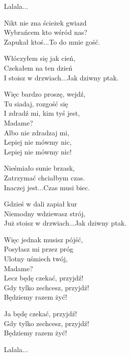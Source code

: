 \begin{textn}
    Lalala...

    Nikt nie zna ścieżek gwiazd\\
    Wybrańcem kto wśród nas?\\
    Zapukał ktoś...To do mnie gość.

    Włóczyłem się jak cień,\\
    Czekałem na ten dzień\\
    I stoisz w drzwiach...Jak dziwny ptak.

    \vin Więc bardzo proszę, wejdź,\\
    \vin Tu siadaj, rozgość się\\
    \vin I zdradź mi, kim tyś jest,\\
    \vin Madame?\\
    \vin Albo nie zdradzaj mi,\\
    \vin Lepiej nie mówmy nic,\\
    \vin Lepiej nie mówmy nic!

    Nieśmiało sunie brzask,\\
    Zatrzymać chciałbym czas.\\
    Inaczej jest...Czas musi biec.

    Gdzieś w dali zapiał kur\\
    Niemodny wdziewasz strój,\\
    Już stoisz w drzwiach...Jak dziwny ptak.

    \vin Więc jednak musisz pójść,\\
    \vin Posyłasz mi przez próg\\
    \vin Ulotny uśmiech twój,\\
    \vin Madame?\\
    \vin Lecz będę czekać, przyjdź!\\
    \vin Gdy tylko zechcesz, przyjdź!\\
    \vin Będziemy razem żyć!

    \vin Ja będę czekać, przyjdź!\\
    \vin Gdy tylko zechcesz, przyjdź!\\
    \vin Będziemy razem żyć!

    Lalala...
\end{textn}
